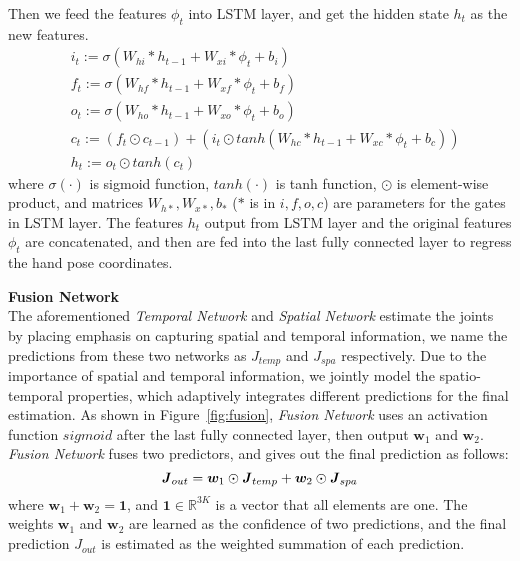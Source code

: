 \documentclass[journal,comsoc]{IEEEtran}
\def \J{\bm{\mathit{J}}}
\begin{document}
Then we feed the features $\phi_t$ into LSTM layer, and get the hidden state $h_t$ as the new features.
\begin{equation}
\begin{aligned}
&i_t := \sigma(W_{hi} * h_{t-1} + W_{xi} * \phi_t + b_i) \\
&f_t := \sigma(W_{hf} * h_{t-1} + W_{xf} * \phi_t + b_f) \\
&o_t := \sigma(W_{ho} * h_{t-1} + W_{xo} * \phi_t + b_o) \\
&c_t := (f_t \odot c_{t-1}) + (i_t \odot tanh(W_{hc} * h_{t-1} + W_{xc} * \phi_t + b_c)) \\
&h_t := o_t \odot tanh(c_t)
\end{aligned}
\end{equation}
where $\sigma(\cdot)$ is sigmoid function, $tanh(\cdot)$ is tanh function, $\odot$ is element-wise product, and matrices
$W_{h*}, W_{x*}, b_{*}$ ($*$ is in $i, f, o, c$) are parameters for the gates in LSTM layer.
The features $h_t$ output from LSTM layer and the original features $\phi_t$ are concatenated,
and then are fed into the last fully connected layer to regress the hand pose coordinates.\vspace{0.5em}

\noindent \textbf{Fusion Network}\vspace{0.5em}\label{sec:fusion network}\\
\indent The aforementioned \emph{Temporal Network} and \emph{Spatial Network} estimate the joints by placing emphasis on
capturing spatial and temporal information, we name the predictions from these two networks as $\J_{temp}$ and $\J_{spa}$ respectively.
Due to the importance of spatial and temporal information, we jointly model the spatio-temporal properties,
which adaptively integrates different predictions for the final estimation. As shown in Figure~\ref{fig:fusion},
\emph{Fusion Network} uses an activation function $sigmoid$ after the last fully connected layer, then output $\bm{w}_1$ and $\bm{w}_2$.
\emph{Fusion Network} fuses two predictors, and gives out the final prediction as follows:
\begin{equation}\label{eq:Fusion Network}
\centering
\J_{out} = \bm{w}_1 \odot \J_{temp} + \bm{w}_2 \odot \J_{spa}
\end{equation}
where $\bm{w}_1 + \bm{w}_2 = \bm{1}$, and $\bm{1} \in \mathbb{R}^{3K}$ is a vector that all elements are one.
The weights $\bm{w}_1$ and $\bm{w}_2$ are learned as the confidence of two predictions, and the final prediction $\J_{out}$
is estimated as the weighted summation of each prediction.
\end{document}
